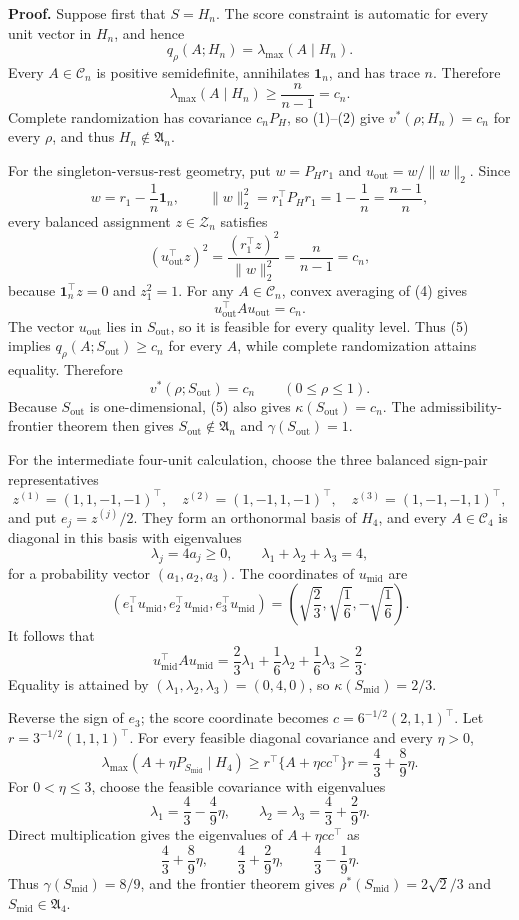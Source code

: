 \textbf{Proof.}
Suppose first that \(S=H_n\). The score constraint is automatic for every unit vector in \(H_n\), and hence
\[
q_\rho(A;H_n)=\lambda_{\max}(A\mid H_n).
\tag{1}
\]
Every \(A\in\mathcal C_n\) is positive semidefinite, annihilates \(\mathbf1_n\), and has trace \(n\). Therefore
\[
\lambda_{\max}(A\mid H_n)\geq\frac{n}{n-1}=c_n.
\tag{2}
\]
Complete randomization has covariance \(c_nP_H\), so (1)--(2) give \(v^*(\rho;H_n)=c_n\) for every \(\rho\), and thus \(H_n\notin\mathfrak A_n\).

For the singleton-versus-rest geometry, put \(w=P_Hr_1\) and \(u_{\mathrm{out}}=w/\|w\|_2\). Since
\[
w=r_1-\frac1n\mathbf1_n,
\qquad
\|w\|_2^2=r_1^\top P_Hr_1=1-\frac1n=\frac{n-1}{n},
\tag{3}
\]
every balanced assignment \(z\in\mathcal Z_n\) satisfies
\[
(u_{\mathrm{out}}^\top z)^2
=\frac{(r_1^\top z)^2}{\|w\|_2^2}
=\frac{n}{n-1}=c_n,
\tag{4}
\]
because \(\mathbf1_n^\top z=0\) and \(z_1^2=1\). For any \(A\in\mathcal C_n\), convex averaging of (4) gives
\[
u_{\mathrm{out}}^\top Au_{\mathrm{out}}=c_n.
\tag{5}
\]
The vector \(u_{\mathrm{out}}\) lies in \(S_{\mathrm{out}}\), so it is feasible for every quality level. Thus (5) implies \(q_\rho(A;S_{\mathrm{out}})\geq c_n\) for every \(A\), while complete randomization attains equality. Therefore
\[
v^*(\rho;S_{\mathrm{out}})=c_n
\qquad(0\leq\rho\leq1).
\tag{6}
\]
Because \(S_{\mathrm{out}}\) is one-dimensional, (5) also gives \(\kappa(S_{\mathrm{out}})=c_n\). The admissibility-frontier theorem then gives \(S_{\mathrm{out}}\notin\mathfrak A_n\) and \(\gamma(S_{\mathrm{out}})=1\).

For the intermediate four-unit calculation, choose the three balanced sign-pair representatives
\[
z^{(1)}=(1,1,-1,-1)^\top,
\quad
z^{(2)}=(1,-1,1,-1)^\top,
\quad
z^{(3)}=(1,-1,-1,1)^\top,
\tag{7}
\]
and put \(e_j=z^{(j)}/2\). They form an orthonormal basis of \(H_4\), and every \(A\in\mathcal C_4\) is diagonal in this basis with eigenvalues
\[
\lambda_j=4a_j\geq0,
\qquad
\lambda_1+\lambda_2+\lambda_3=4,
\tag{8}
\]
for a probability vector \((a_1,a_2,a_3)\). The coordinates of \(u_{\mathrm{mid}}\) are
\[
(e_1^\top u_{\mathrm{mid}},e_2^\top u_{\mathrm{mid}},e_3^\top u_{\mathrm{mid}})
=\left(\sqrt{\frac23},\sqrt{\frac16},-\sqrt{\frac16}\right).
\tag{9}
\]
It follows that
\[
u_{\mathrm{mid}}^\top Au_{\mathrm{mid}}
=\frac23\lambda_1+\frac16\lambda_2+\frac16\lambda_3
\geq\frac23.
\tag{10}
\]
Equality is attained by \((\lambda_1,\lambda_2,\lambda_3)=(0,4,0)\), so \(\kappa(S_{\mathrm{mid}})=2/3\).

Reverse the sign of \(e_3\); the score coordinate becomes \(c=6^{-1/2}(2,1,1)^\top\). Let \(r=3^{-1/2}(1,1,1)^\top\). For every feasible diagonal covariance and every \(\eta>0\),
\[
\lambda_{\max}(A+\eta P_{S_{\mathrm{mid}}}\mid H_4)
\geq r^\top\{A+\eta cc^\top\}r
=\frac43+\frac89\eta.
\tag{11}
\]
For \(0<\eta\leq3\), choose the feasible covariance with eigenvalues
\[
\lambda_1=\frac43-\frac49\eta,
\qquad
\lambda_2=\lambda_3=\frac43+\frac29\eta.
\tag{12}
\]
Direct multiplication gives the eigenvalues of \(A+\eta cc^\top\) as
\[
\frac43+\frac89\eta,
\qquad
\frac43+\frac29\eta,
\qquad
\frac43-\frac19\eta.
\tag{13}
\]
Thus \(\gamma(S_{\mathrm{mid}})=8/9\), and the frontier theorem gives \(\rho^*(S_{\mathrm{mid}})=2\sqrt2/3\) and \(S_{\mathrm{mid}}\in\mathfrak A_4\).

